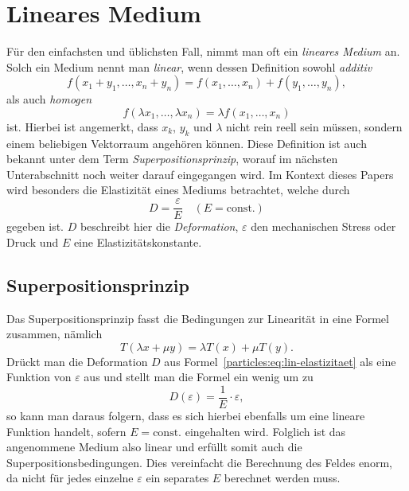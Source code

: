 %
%
%
%
\section{Lineares Medium\label{particles:section:linear}}
Für den einfachsten und üblichsten Fall, nimmt man oft ein \emph{lineares Medium} an.
Solch ein Medium nennt man \emph{linear}, wenn dessen Definition sowohl \emph{additiv}
\[
    f(x_{1} + y_{1}, \ldots, x_{n} + y_{n}) 
    = f(x_{1}, \ldots, x_{n}) + f(y_{1}, \ldots, y_{n}),
\]
als auch \emph{homogen}
\[
    f(\lambda x_{1}, \ldots, \lambda x_{n}) 
    = \lambda f(x_{1}, \ldots, x_{n})
\]
ist.
Hierbei ist angemerkt, dass $x_{k}$, $y_{k}$ und $\lambda$ nicht rein reell sein müssen, 
sondern einem beliebigen Vektorraum angehören können. %
Diese Definition ist auch bekannt unter dem Term \emph{Superpositionsprinzip}, 
worauf im nächsten Unterabschnitt noch weiter darauf eingegangen wird. %
Im Kontext dieses Papers wird besonders die Elastizität eines Mediums betrachtet, 
welche durch
\[
    D %
    = \frac{\varepsilon}{E}
    \quad
    (E = \text{const.})\label{particles:eq:lin-elastizitaet}
\]
gegeben ist. 
$D$ beschreibt hier die \emph{Deformation},
$\varepsilon$ den mechanischen Stress oder Druck und %
$E$ eine Elastizitätskonstante.


\subsection{Superpositionsprinzip}
Das Superpositionsprinzip fasst die Bedingungen zur Linearität in eine Formel zusammen, nämlich
\[
    T(\lambda x + \mu y)
    = \lambda T(x) + \mu T(y).
\]
Drückt man die Deformation $D$ aus Formel~\ref{particles:eq:lin-elastizitaet} als eine Funktion von $\varepsilon$ aus
und stellt man die Formel ein wenig um zu 
\[
    D(\varepsilon)
    = \frac{1}{E} \cdot \varepsilon,
\]
so kann man daraus folgern, dass es sich hierbei ebenfalls um eine lineare Funktion handelt, 
sofern $E = \text{const.}$ eingehalten wird.
Folglich ist das angenommene Medium also linear und erfüllt somit auch die Superpositionsbedingungen.
Dies vereinfacht die Berechnung des Feldes enorm, 
da nicht für jedes einzelne $\varepsilon$ ein separates $E$ berechnet werden muss. 


